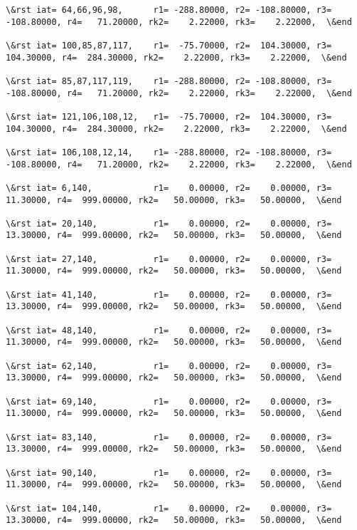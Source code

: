 \documentclass[11pt]{article}
\begin{document}
\begin{Verbatim}[commandchars=\\\{\}]
\&rst iat= 64,66,96,98,      r1= -288.80000, r2= -108.80000, r3= -108.80000, r4=   71.20000, rk2=    2.22000, rk3=    2.22000,  \&end

\&rst iat= 100,85,87,117,    r1=  -75.70000, r2=  104.30000, r3=  104.30000, r4=  284.30000, rk2=    2.22000, rk3=    2.22000,  \&end

\&rst iat= 85,87,117,119,    r1= -288.80000, r2= -108.80000, r3= -108.80000, r4=   71.20000, rk2=    2.22000, rk3=    2.22000,  \&end

\&rst iat= 121,106,108,12,   r1=  -75.70000, r2=  104.30000, r3=  104.30000, r4=  284.30000, rk2=    2.22000, rk3=    2.22000,  \&end

\&rst iat= 106,108,12,14,    r1= -288.80000, r2= -108.80000, r3= -108.80000, r4=   71.20000, rk2=    2.22000, rk3=    2.22000,  \&end

\&rst iat= 6,140,            r1=    0.00000, r2=    0.00000, r3=   11.30000, r4=  999.00000, rk2=   50.00000, rk3=   50.00000,  \&end

\&rst iat= 20,140,           r1=    0.00000, r2=    0.00000, r3=   13.30000, r4=  999.00000, rk2=   50.00000, rk3=   50.00000,  \&end

\&rst iat= 27,140,           r1=    0.00000, r2=    0.00000, r3=   11.30000, r4=  999.00000, rk2=   50.00000, rk3=   50.00000,  \&end

\&rst iat= 41,140,           r1=    0.00000, r2=    0.00000, r3=   13.30000, r4=  999.00000, rk2=   50.00000, rk3=   50.00000,  \&end

\&rst iat= 48,140,           r1=    0.00000, r2=    0.00000, r3=   11.30000, r4=  999.00000, rk2=   50.00000, rk3=   50.00000,  \&end

\&rst iat= 62,140,           r1=    0.00000, r2=    0.00000, r3=   13.30000, r4=  999.00000, rk2=   50.00000, rk3=   50.00000,  \&end

\&rst iat= 69,140,           r1=    0.00000, r2=    0.00000, r3=   11.30000, r4=  999.00000, rk2=   50.00000, rk3=   50.00000,  \&end

\&rst iat= 83,140,           r1=    0.00000, r2=    0.00000, r3=   13.30000, r4=  999.00000, rk2=   50.00000, rk3=   50.00000,  \&end

\&rst iat= 90,140,           r1=    0.00000, r2=    0.00000, r3=   11.30000, r4=  999.00000, rk2=   50.00000, rk3=   50.00000,  \&end

\&rst iat= 104,140,          r1=    0.00000, r2=    0.00000, r3=   13.30000, r4=  999.00000, rk2=   50.00000, rk3=   50.00000,  \&end


\end{Verbatim}
\end{document}
